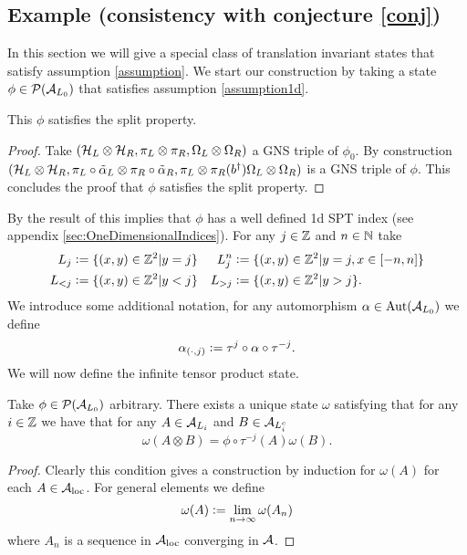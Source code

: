 \documentclass[11pt,a4paper,twoside]{article}
\numberwithin{equation}{section}
\begin{document}
\subsection{Example (consistency with conjecture \ref{conj})}\label{sec:OneTranslationDirectionExample}
In this section we will give a special class of translation invariant states that satisfy assumption \ref{assumption}. We start our construction by taking a state $\phi\in\PP(\AA_{L_0})$ that satisfies assumption \ref{assumption1d}.
\begin{lemma}\label{lem:phiExampleConsistentWithConjectureSplitProperty}
	This $\phi$ satisfies the split property.
\end{lemma}
\begin{proof}
	Take $(\HH_L\otimes\HH_R,\pi_L\otimes\pi_R,\Omega_L\otimes\Omega_R)$ a GNS triple of $\phi_0$. By construction $(\HH_L\otimes\HH_R,\pi_L\circ\tilde\alpha_L\otimes\pi_R\circ\tilde\alpha_R,\pi_L\otimes\pi_R(b^\dagger)\Omega_L\otimes\Omega_R)$ is a GNS triple of $\phi$. This concludes the proof that $\phi$ satisfies the split property.
\end{proof}
By the result of \cite{ogata2019classification} this implies that $\phi$ has a well defined 1d SPT index (see appendix \ref{sec:OneDimensionalIndices}). For any $j\in\ZZ$ and $n\in\NN$ take
\begin{align}
	L_j&\defeq \{(x,y)\in\ZZ^2|y=j\}&L_{j}^{n}&\defeq \{(x,y)\in\ZZ^2|y=j,x\in[-n,n]\}\\
	L_{<j}&\defeq \{(x,y)\in\ZZ^2|y<j\}&L_{>j}&\defeq \{(x,y)\in\ZZ^2|y>j\}.
\end{align}
We introduce some additional notation, for any automorphism $\alpha\in\Aut{\AA_{L_0}}$ we define 
\begin{equation}
	\alpha_{(\cdot,j)}\defeq \tau^j\circ\alpha\circ\tau^{-j}.
\end{equation}
We will now define the infinite tensor product state.
\begin{definition}\label{def:InfiniteTensorProductState}
	Take $\phi\in\PP(\AA_{L_0})$ arbitrary. There exists a unique state $\omega$ satisfying that for any $i\in\ZZ$ we have that for any $A\in\AA_{L_i}$ and $B\in\AA_{L_i^c}$
	\begin{equation}
		\omega(A\otimes B)=\phi\circ\tau^{-j}(A)\omega(B).
	\end{equation}
\end{definition}
\begin{proof}
	Clearly this condition gives a construction by induction for $\omega(A)$ for each $A\in\AA_{\text{loc}}$. For general elements we define
	\begin{equation}
		\omega(A)\defeq \lim_{n\rightarrow\infty}\omega(A_n)
	\end{equation}
	where $A_n$ is a sequence in $\AA_{\text{loc}}$ converging in $\AA$.
\end{proof}
\end{document}
